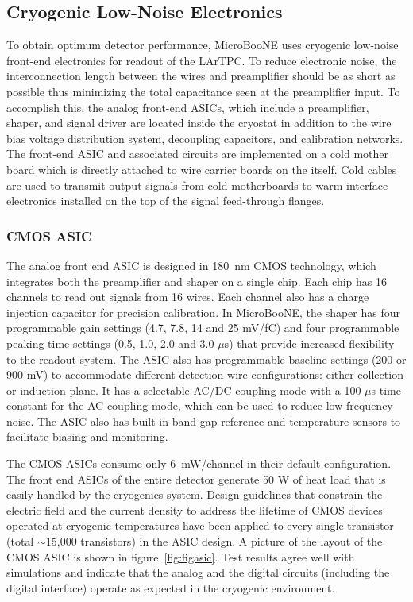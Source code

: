 \subsection{Cryogenic Low-Noise Electronics}
\label{sec:coldelectronics}
To obtain optimum detector performance, MicroBooNE uses cryogenic low-noise front-end electronics for readout of the LArTPC. To reduce electronic noise, the interconnection length between the \lartpc wires and preamplifier should be as short as possible thus minimizing the total capacitance seen at the preamplifier input. To accomplish this, the analog front-end ASICs, which include a preamplifier, shaper, and signal driver are located inside the cryostat in addition to the wire bias voltage distribution system, decoupling capacitors, and calibration networks. The front-end ASIC and associated circuits are implemented on a cold mother board which is directly attached to wire carrier boards on the \lartpc itself. Cold cables are used to transmit output signals from cold motherboards to warm interface electronics installed on the top of the signal feed-through flanges.

\subsubsection{CMOS ASIC}

The analog front end ASIC is designed in 180~nm CMOS technology, which integrates both the preamplifier and shaper on a single chip. Each chip has 16 channels to read out signals from 16 wires. Each channel also has a charge injection capacitor for precision calibration. In MicroBooNE, the shaper has four programmable gain settings (4.7, 7.8, 14 and 25 mV/fC) and four programmable peaking time settings (0.5, 1.0, 2.0 and 3.0 $\mu$s) that provide increased flexibility to the readout system. The ASIC also has programmable baseline settings (200 or 900 mV) to accommodate different detection wire configurations: either collection or induction plane. It has a selectable AC/DC coupling mode with a 100 $\mu$s time constant for the AC coupling mode, which can be used to reduce low frequency noise. The ASIC also has built-in band-gap reference and temperature sensors to facilitate biasing and monitoring.

The CMOS ASICs consume only 6~mW/channel in their default configuration. The front end ASICs of the entire detector generate 50 W of heat load that is easily handled by the cryogenics system. Design guidelines that constrain the electric field and the current density to address the lifetime of CMOS devices operated at cryogenic temperatures have been applied to every single transistor (total $\sim$15,000 transistors) in the ASIC design. A picture of the layout of the CMOS ASIC is shown in figure~\ref{fig:figasic}. Test results agree well with simulations and indicate that the analog and the digital circuits (including the digital interface) operate as expected in the cryogenic environment. 


